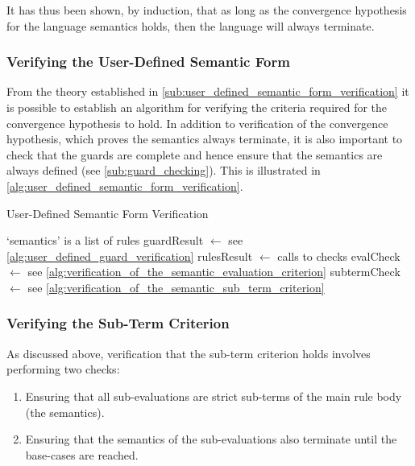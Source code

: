 It has thus been shown, by induction, that as long as the convergence hypothesis for the language semantics holds, then the language will always terminate.


\subsubsection{Verifying the User-Defined Semantic Form} %
\label{ssub:verifying_the_user_defined_semantic_form}
From the theory established in \autoref{sub:user_defined_semantic_form_verification} it is possible to establish an algorithm for verifying the criteria required for the convergence hypothesis to hold.
In addition to verification of the convergence hypothesis, which proves the semantics always terminate, it is also important to check that the guards are complete and hence ensure that the semantics are always defined (see \autoref{sub:guard_checking}).
This is illustrated in \autoref{alg:user_defined_semantic_form_verification}.

\begin{breakablealgorithm}
\caption{User-Defined Semantic Form Verification}
\label{alg:user_defined_semantic_form_verification}
\begin{algorithmic}
    \Comment `semantics' is a list of rules
    \State guardResult $\gets$ 
    \Comment see \autoref{alg:user_defined_guard_verification}
    \State rulesResult $\gets$ 
    \State {}
\EndFunction
\State
{}
    \Comment calls to checks
    \State evalCheck $\gets$ 
    \Comment see \autoref{alg:verification_of_the_semantic_evaluation_criterion}
    \State subtermCheck $\gets$ 
    \LineComment see \autoref{alg:verification_of_the_semantic_sub_term_criterion}
    \State {}
\EndFunction
\end{algorithmic}
\end{breakablealgorithm}


\subsubsection{Verifying the Sub-Term Criterion} %
\label{ssub:verifying_the_sub_term_criterion}
As discussed above, verification that the sub-term criterion holds involves performing two checks:
\begin{enumerate}
    \item Ensuring that all sub-evaluations are strict sub-terms of the main rule body (the semantics).
    \item Ensuring that the semantics of the sub-evaluations also terminate until the base-cases are reached. 
\end{enumerate}

